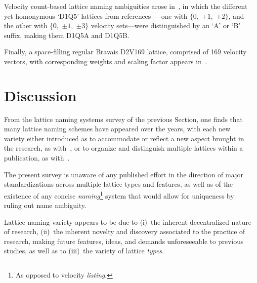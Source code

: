     Velocity count-based lattice naming ambiguities arose in~\cite{2017-PengY+ZhangJM-MathProblEng}, in which the different  yet
    homonymous            `D1Q5'            lattices            from            references~\cite{1998-QianYH+ZhouY-EuroPhysLett,
    2006-ChikatamarlaSS+KarlinIV-PhysRevLett}---one with $\{0,$ $\pm 1,$ $\pm 2\}$, and the other with $\{0,$ $\pm 1,$ $\pm 3\}$
    velocity sets---were distinguished by an `A' or `B' suffix, making them D1Q5A and D1Q5B.

    Finally, a space-filling regular Bravais D2V169 lattice, comprised of 169 velocity vectors, with corresponding  weights  and
    scaling factor appears in~\cite[p.~68]{2019-daRosaTG-MEngUTFPR}.



\section{Discussion}

    From the lattice naming systems survey of the previous Section, one finds that many lattice  naming  schemes  have  appeared
    over the years, with each new variety either introduced as to accommodate or reflect a new aspect brought in  the  research,
    as  with~\cite{2006-ShanX+ChenH-JFluidMech,   2008-ChikatamarlaSS+KarlinIV-CompPhysComm,   2006-PhilippiPC+SurmasR-PhysRevE,
    2012-AmbrusVE+SofoneaV-PhysRevE, 2016-NamburiM+AnsumaliS-SciRep}, or to organize and distinguish multiple lattices within  a
    publication,        as        with~\cite{1991-QianYH+LallemandP-AdvKinTheoContMech,        2006-PhilippiPC+SurmasR-PhysRevE,
    2007-OrtizCEP-DrUFSC, 2014-MengJ+ZhangY-JComputPhys, 2017-LiL+KlausnerJF-IntJHeatMassTran}.

    The present survey is unaware of any published effort in the direction of major  standardizations  across  multiple  lattice
    types  and  features,  as  well  as  of  the  existence  of  any  concise  \emph{naming}\footnote{As  opposed  to   velocity
    \emph{listing}.} system that would allow for uniqueness by ruling out name ambiguity.

    Lattice naming variety appears to be due to (i)~the inherent decentralized nature of research, (ii)~the inherent novelty and
    discovery associated to the practice of research, making future features,  ideas,  and  demands  unforeseeable  to  previous
    studies, as well as to (iii)~the variety of lattice \emph{types}.

